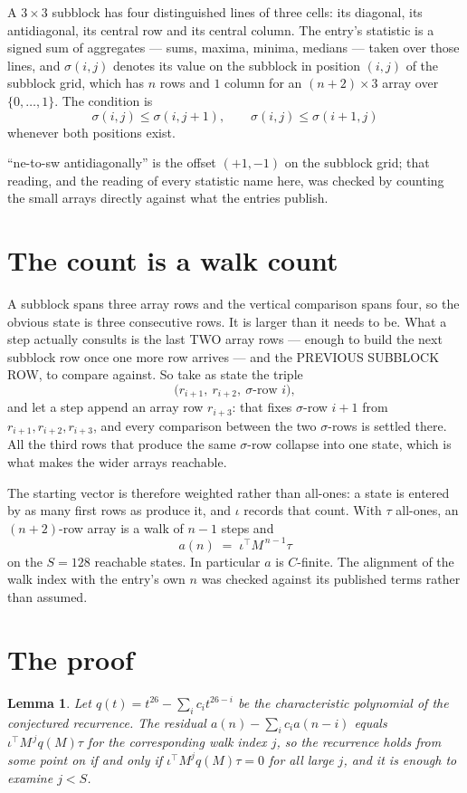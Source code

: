 \documentclass[11pt,a4paper]{article}
\theoremstyle{plain}
\newtheorem{lemma}[theorem]{Lemma}
\theoremstyle{definition}
\begin{document}
A $3\times3$ subblock has four distinguished lines of three cells: its diagonal, its
antidiagonal, its central row and its central column. The entry's statistic is a signed sum of
aggregates --- sums, maxima, minima, medians --- taken over those lines, and $\sigma(i,j)$
denotes its value on the subblock in position $(i,j)$ of the subblock grid, which has $n$ rows
and $1$ column for an $(n+2)\times3$ array over $\{0,\dots,1\}$. The condition is
\[
\sigma(i,j)\le\sigma(i,j+1),\qquad \sigma(i,j)\le\sigma(i+1,j)
\]
whenever both positions exist.

``ne-to-sw antidiagonally'' is the offset $(+1,-1)$ on the subblock grid; that reading, and
the reading of every statistic name here, was checked by counting the small arrays directly
against what the entries publish.

\section{The count is a walk count}

A subblock spans three array rows and the vertical comparison spans four, so the obvious state
is three consecutive rows. It is larger than it needs to be. What a step actually consults is
the last TWO array rows --- enough to build the next subblock row once one more row arrives ---
and the PREVIOUS SUBBLOCK ROW, to compare against. So take as state the triple
\[
\bigl(r_{i+1},\ r_{i+2},\ \sigma\text{-row }i\bigr),
\]
and let a step append an array row $r_{i+3}$: that fixes $\sigma$-row $i+1$ from
$r_{i+1},r_{i+2},r_{i+3}$, and every comparison between the two $\sigma$-rows is settled
there. All the third rows that produce the same $\sigma$-row collapse into one state, which is
what makes the wider arrays reachable.

The starting vector is therefore weighted rather than all-ones: a state is entered by as many
first rows as produce it, and $\iota$ records that count. With $\tau$ all-ones, an
$(n+2)$-row array is a walk of $n-1$ steps and
\[
a(n)\;=\;\iota^{\!\top}M^{\,n-1}\tau
\]
on the $S=128$ reachable states. In particular $a$ is $C$-finite. The alignment of the walk
index with the entry's own $n$ was checked against its published terms rather than assumed.

\section{The proof}

\begin{lemma}\label{lem:crit}
Let $q(t)=t^{26}-\sum_i c_it^{26-i}$ be the characteristic polynomial of the
conjectured recurrence. The residual $a(n)-\sum_ic_ia(n-i)$ equals
$\iota^{\!\top}M^{\,j}q(M)\tau$ for the corresponding walk index $j$, so the recurrence
holds from some point on if and only if $\iota^{\!\top}M^{j}q(M)\tau=0$ for all large $j$,
and it is enough to examine $j<S$.
\end{lemma}
\end{document}
